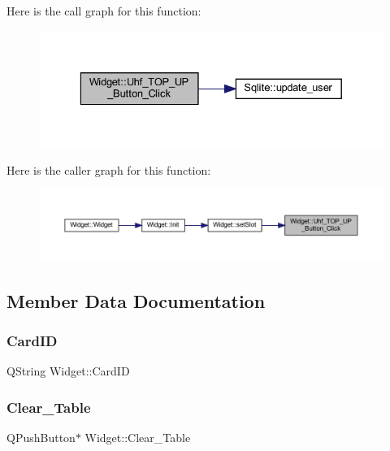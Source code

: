Here is the call graph for this function\+:
\nopagebreak
\begin{figure}[H]
\begin{center}
\leavevmode
\includegraphics[width=329pt]{class_widget_aeec0c7444513091532005eef26048a91_cgraph}
\end{center}
\end{figure}
Here is the caller graph for this function\+:
\nopagebreak
\begin{figure}[H]
\begin{center}
\leavevmode
\includegraphics[width=350pt]{class_widget_aeec0c7444513091532005eef26048a91_icgraph}
\end{center}
\end{figure}


\subsection{Member Data Documentation}
\mbox{\label{class_widget_aba2c65627eca33b72eca29bc6d74f5f8}} 
\subsubsection{\texorpdfstring{CardID}{CardID}}
{\footnotesize\ttfamily Q\+String Widget\+::\+Card\+ID\hspace{0.3cm}{\ttfamily [private]}}

\mbox{\label{class_widget_aa3cade7629649f1512fa424cb020defb}} 
\subsubsection{\texorpdfstring{Clear\_Table}{Clear\_Table}}
{\footnotesize\ttfamily Q\+Push\+Button$\ast$ Widget\+::\+Clear\+\_\+\+Table\hspace{0.3cm}{\ttfamily [private]}}

